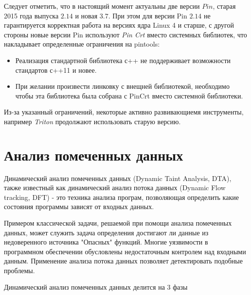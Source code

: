 Следует отметить, что в настоящий момент актуальны две версии $Pin$, старая 2015 года выпуска $2.14$ и новая $3.7$. При этом для версии Pin $2.14$ не гарантируется корректная работа на версиях ядра Linux 4 и старше, с другой стороны новые версии Pin используют \emph{Pin Crt} вместо системных библиотек, что накладывает определенные ограничения на pintools:

\begin{itemize}
    \item Реализация стандартной библиотека с++ не поддерживает возможности стандартов с++11 и новее.
    \item При желании произвести линковку с внещней библиотекой, необходимо чтобы эта библиотека была собрана с PinCrt вместо системной библиотеки.
\end{itemize}

Из-за указанный ограничений, некоторые активно развивающиемя инструменты, например \emph{Triton} продолжают использовать старую версию.

\section{Анализ помеченных данных}

Динамический анализ помеченных данных (Dynamic Taint Analysis, DTA), также известный как динамический анализ потока данных (Dynamic Flow tracking, DFT) - это техника анализа програм, позволяющая определить какие состояния программы зависят от входных данных.

Примером классической задачи, решаемой при помощи анализа помеченных данных, может служить задача определения достигают ли данные из недоверенного источника "Опасных" функций. Многие уязвимости в программном обеспечении обусловлены недостаточным контролем над входными данным. Применение анализа потока данных позволяет детектировать подобные проблемы.

Динамический анализ помеченных данных делится на 3 фазы

